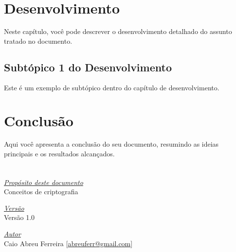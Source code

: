\documentclass[a4paper,12pt]{report}
\begin{document}
\chapter{Desenvolvimento}
Neste capítulo, você pode descrever o desenvolvimento detalhado do assunto tratado no documento.

\section{Subtópico 1 do Desenvolvimento}
Este é um exemplo de subtópico dentro do capítulo de desenvolvimento.

\newpage

\chapter{Conclusão}
Aqui você apresenta a conclusão do seu documento, resumindo as ideias principais e os resultados alcançados.

\newpage

\chapter*{} %
\vspace*{\fill}
\begin{flushright}
	\underline{\textit{Propósito deste documento}}\\
	Conceitos de criptografia\bigskip

	\underline{\textit{Versão}}\\
	Versão 1.0\bigskip

	\underline{\textit{Autor}}\\
	Caio Abreu Ferreira [\href{mailto:abreuferr@gmail.com}{abreuferr@gmail.com}] \bigskip\\
\end{flushright}
\end{document}
